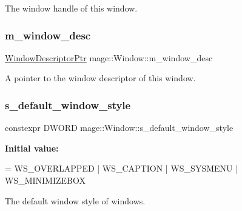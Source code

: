 The window handle of this window. \mbox{\label{classmage_1_1_window_a51bbea46f4590a68d384d0b8d14e0cd8}} 
\subsubsection{\texorpdfstring{m\+\_\+window\+\_\+desc}{m\_window\_desc}}
{\footnotesize\ttfamily \mbox{\hyperlink{classmage_1_1_window_ac41b052d8e8dd0571b3ec862e8f6da05}{Window\+Descriptor\+Ptr}} mage\+::\+Window\+::m\+\_\+window\+\_\+desc\hspace{0.3cm}{\ttfamily [private]}}

A pointer to the window descriptor of this window. \mbox{\label{classmage_1_1_window_ac680bdd3d5359f66b2dea082ef45e0da}} 
\subsubsection{\texorpdfstring{s\+\_\+default\+\_\+window\+\_\+style}{s\_default\_window\_style}}
{\footnotesize\ttfamily constexpr D\+W\+O\+RD mage\+::\+Window\+::s\+\_\+default\+\_\+window\+\_\+style\hspace{0.3cm}{\ttfamily [static]}}

{\bfseries Initial value\+:}
\begin{DoxyCode}
= WS\_OVERLAPPED 
                                                      | WS\_CAPTION 
                                                      | WS\_SYSMENU 
                                                      | WS\_MINIMIZEBOX
\end{DoxyCode}
The default window style of windows. 
